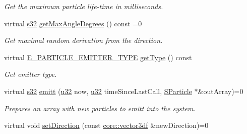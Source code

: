 \begin{DoxyCompactItemize}
\begin{DoxyCompactList}\small\item\em Get the maximum particle life-\/time in milliseconds. \end{DoxyCompactList}\item 
\mbox{\label{classirr_1_1scene_1_1IParticleEmitter_acce76d94b340feea5b35416e0a9705ae}} 
virtual \hyperlink{namespaceirr_ac66849b7a6ed16e30ebede579f9b47c6}{s32} \hyperlink{classirr_1_1scene_1_1IParticleEmitter_acce76d94b340feea5b35416e0a9705ae}{get\+Max\+Angle\+Degrees} () const =0
\begin{DoxyCompactList}\small\item\em Get maximal random derivation from the direction. \end{DoxyCompactList}\item 
\mbox{\label{classirr_1_1scene_1_1IParticleEmitter_a3eca8b0f8914803778cbfdf2731f3245}} 
virtual \hyperlink{namespaceirr_1_1scene_a3e251a881c886884a78adea2e546272b}{E\+\_\+\+P\+A\+R\+T\+I\+C\+L\+E\+\_\+\+E\+M\+I\+T\+T\+E\+R\+\_\+\+T\+Y\+PE} \hyperlink{classirr_1_1scene_1_1IParticleEmitter_a3eca8b0f8914803778cbfdf2731f3245}{get\+Type} () const
\begin{DoxyCompactList}\small\item\em Get emitter type. \end{DoxyCompactList}\item 
virtual \hyperlink{namespaceirr_ac66849b7a6ed16e30ebede579f9b47c6}{s32} \hyperlink{classirr_1_1scene_1_1IParticleEmitter_aaf773f8ce5db3b5a2455561ef7818506}{emitt} (\hyperlink{namespaceirr_a0416a53257075833e7002efd0a18e804}{u32} now, \hyperlink{namespaceirr_a0416a53257075833e7002efd0a18e804}{u32} time\+Since\+Last\+Call, \hyperlink{structirr_1_1scene_1_1SParticle}{S\+Particle} $\ast$\&out\+Array)=0
\begin{DoxyCompactList}\small\item\em Prepares an array with new particles to emitt into the system. \end{DoxyCompactList}\item 
\mbox{\label{classirr_1_1scene_1_1IParticleEmitter_abb433f4f96ad468c0314138743ae1044}} 
virtual void \hyperlink{classirr_1_1scene_1_1IParticleEmitter_abb433f4f96ad468c0314138743ae1044}{set\+Direction} (const \hyperlink{namespaceirr_1_1core_ae6e2b2a6c552833ebbd5b7463d03586b}{core\+::vector3df} \&new\+Direction)=0

\end{DoxyCompactItemize}
